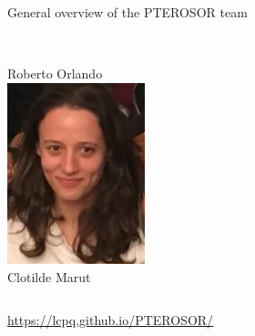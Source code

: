 \documentclass[aspectratio=169,9pt]{beamer}
\begin{document}
\begin{frame}{General overview of the PTEROSOR team}
\begin{columns}
\begin{column}{0.325\textwidth}
                        \\
                        Roberto Orlando
                        \\
                        \vspace{0.25cm}
                        \includegraphics[width=0.3\textwidth]{fig/Clotilde}
                        \\
                        Clotilde Marut
                        \\
                \end{column}
        \end{columns}
                        \vspace{-0.5cm}
        \url{https://lcpq.github.io/PTEROSOR/}
\end{frame}
\end{document}
